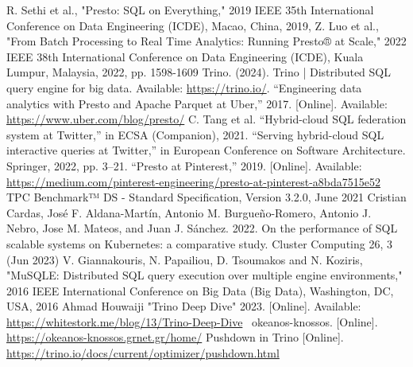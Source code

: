 \documentclass[conference]{IEEEtran}
\begin{document}
\begin{thebibliography}{00}
	 R. Sethi et al., "Presto: SQL on Everything," 2019 IEEE 35th International Conference on Data Engineering (ICDE), Macao, China, 2019,
	 Z. Luo et al., "From Batch Processing to Real Time Analytics: Running Presto® at Scale," 2022 IEEE 38th International Conference on Data Engineering (ICDE), Kuala Lumpur, Malaysia, 2022, pp. 1598-1609
	 Trino. (2024). Trino | Distributed SQL query engine for big data. Available: \href{https://trino.io/}{https://trino.io/}.
	 “Engineering data analytics with Presto and Apache Parquet at Uber,” 2017. [Online]. Available: \href{https://www.uber.com/blog/presto/}{https://www.uber.com/blog/presto/}
	 C. Tang et al. “Hybrid-cloud SQL federation system at Twitter,” in ECSA (Companion), 2021.
	 “Serving hybrid-cloud SQL interactive queries at Twitter,” in European Conference on Software Architecture. Springer, 2022, pp. 3–21.
	 “Presto at Pinterest,” 2019. [Online]. Available: \href{https://medium.com/pinterest-engineering/presto-at-pinterest-a8bda7515e52}{https://medium.com/pinterest-engineering/presto-at-pinterest-a8bda7515e52}
	 TPC Benchmark™ DS - Standard Specification, Version 3.2.0, June 2021
	 Cristian Cardas, José F. Aldana-Martín, Antonio M. Burgueño-Romero, Antonio J. Nebro, Jose M. Mateos, and Juan J. Sánchez. 2022. On the performance of SQL scalable systems on Kubernetes: a comparative study. Cluster Computing 26, 3 (Jun 2023)
	 V. Giannakouris, N. Papailiou, D. Tsoumakos and N. Koziris, "MuSQLE: Distributed SQL query execution over multiple engine environments," 2016 IEEE International Conference on Big Data (Big Data), Washington, DC, USA, 2016
	 Ahmad Houwaiji "Trino Deep Dive" 2023. [Online]. Available: \href{https://whitestork.me/blog/13/Trino-Deep-Dive}{https://whitestork.me/blog/13/Trino-Deep-Dive}
	 ~okeanos-knossos. [Online]. \href{https://okeanos-knossos.grnet.gr/home/}{https://okeanos-knossos.grnet.gr/home/}
	 Pushdown in Trino [Online]. \href{https://trino.io/docs/current/optimizer/pushdown.html}{https://trino.io/docs/current/optimizer/pushdown.html}
\end{thebibliography}
\end{document}
